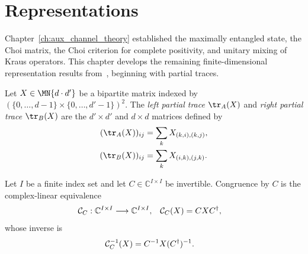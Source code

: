 \section{Representations}
\label{sec:representations_infrastructure}

Chapter~\ref{ch:aux_channel_theory} established the maximally entangled state, the
Choi matrix, the Choi criterion for complete positivity, and unitary mixing of
Kraus operators. This chapter develops the remaining finite-dimensional
representation results from~\cite[Chapter~2]{Wolf2012Quantum}, beginning with
partial traces.

\begin{definition}\label{def:partial_trace}
    \leanok
    Let $X \in \MN{d \cdot d'}$ be a bipartite matrix indexed by
    $(\{0,\ldots,d-1\} \times \{0,\ldots,d'-1\})^2$.
    The \emph{left partial trace} $\tr_A(X)$ and
    \emph{right partial trace} $\tr_B(X)$ are the
    $d' \times d'$ and $d \times d$ matrices defined by
    \begin{align}
        (\tr_A(X))_{ij}
        &= \sum_{k} X_{(k,i),(k,j)},
        \notag\\
        (\tr_B(X))_{ij}
        &= \sum_{k} X_{(i,k),(j,k)}.
        \notag
    \end{align}
\end{definition}

\begin{definition}
    \label{def:invertible_matrix_congruence}
    \leanok
    Let $I$ be a finite index set and let $C\in\mathbb C^{I\times I}$ be
    invertible. Congruence by $C$ is the complex-linear equivalence
    \begin{align}
        \mathcal C_C:\mathbb C^{I\times I}&\longrightarrow
            \mathbb C^{I\times I},
        &
        \mathcal C_C(X)&=CXC^\dagger,
        \notag
    \end{align}
    whose inverse is
    \begin{align}
        \mathcal C_C^{-1}(X)
        &=C^{-1}X(C^\dagger)^{-1}.
        \notag
    \end{align}
\end{definition}

